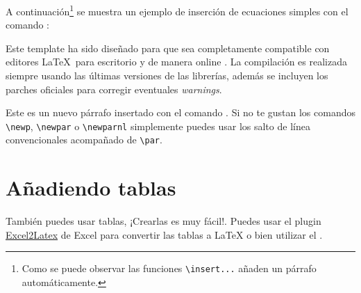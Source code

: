
	A continuación\footnote{Como se puede observar las funciones \texttt{\textbackslash insert...} añaden un párrafo automáticamente.} se muestra un ejemplo de inserción de ecuaciones simples con el comando \href{https://latex.ppizarror.com/informe.html#hlp-formulae}{}:


	Este template ha sido diseñado para que sea completamente compatible con editores \LaTeX\ para escritorio y de manera online . La compilación es realizada siempre usando las últimas versiones de las librerías, además se incluyen los parches oficiales para corregir eventuales \textit{warnings}.

	\newp Este es un nuevo párrafo insertado con el comando \href{https://latex.ppizarror.com/informe.html#hlp-parrafo}{}. Si no te gustan los comandos \texttt{\textbackslash newp}, \texttt{\textbackslash newpar} o \texttt{\textbackslash newparnl} simplemente puedes usar los salto de línea convencionales acompañado de \texttt{\textbackslash par}.
	
	\newp \lipsum[4]
	
	\newp \lipsum[11]

\section{Añadiendo tablas}

	También puedes usar tablas, ¡Crearlas es muy fácil!. Puedes usar el plugin \href{https://www.ctan.org/tex-archive/support/excel2latex/}{Excel2Latex} \cite{excel2latex} de Excel para convertir las tablas a \LaTeX\xspace o bien utilizar el  \cite{tablesgenerator}.

